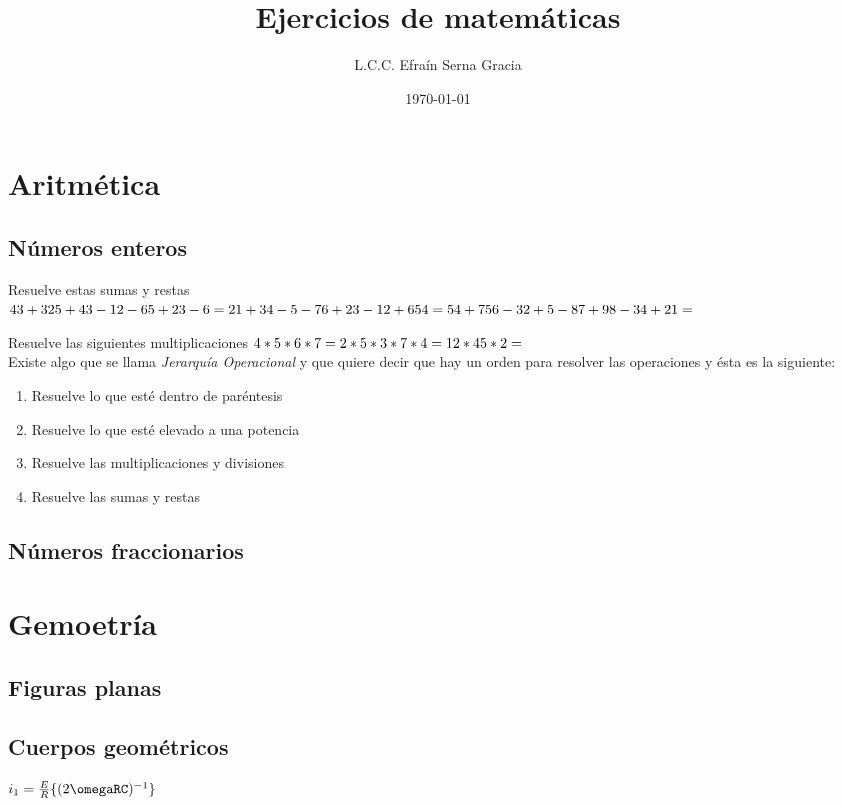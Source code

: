 \documentclass[12pt,spanish,lettersize]{article}
\title{\color{Maroon}Ejercicios de matem\'aticas}
\author{L.C.C. Efra\'in Serna Gracia}
\date{\color{gray}\today}
\begin{document}
\maketitle
\section{Aritm\'etica}
\subsection{N\'umeros enteros}
Resuelve estas sumas y restas
\begin{math}
\\
43+325+43-12-65+23-6=\\
21+34-5-76+23-12+654=\\
54+756-32+5-87+98-34+21=\\
\end{math}

Resuelve las siguientes multiplicaciones
\begin{math}
\\
4*5*6*7=\\
2*5*3*7*4=\\
12*45*2=
\end{math}\\

Existe algo que se llama \emph{Jerarqu\'ia Operacional} y que quiere decir que hay un orden para resolver las operaciones y \'esta es la siguiente:\\
\begin{enumerate}
\item Resuelve lo que est\'e dentro de par\'entesis
\item Resuelve lo que est\'e elevado a una potencia
\item Resuelve las multiplicaciones y divisiones
\item Resuelve las sumas y restas
\end{enumerate}


\subsection{N\'umeros fraccionarios}
\section{Gemoetr\'ia}
\subsection{Figuras planas}
\subsection{Cuerpos geom\'etricos}
\begin{math}
i_{1} = \frac{E}{R}\{(2\omegaRC)^{-1}\}
\end{math}
\end{document}
